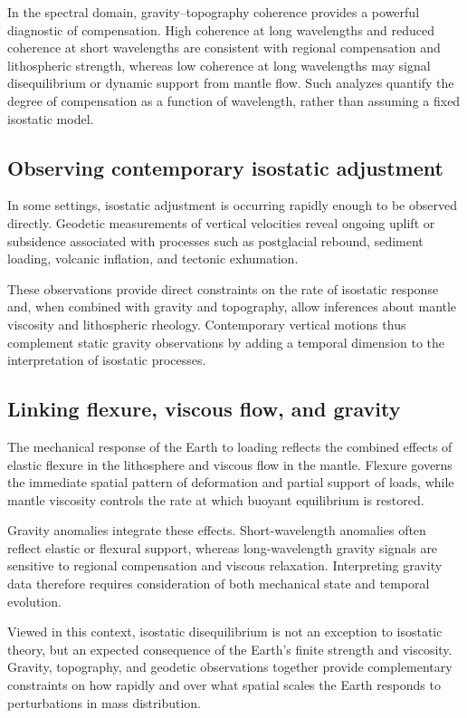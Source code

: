 In the spectral domain, gravity--topography coherence provides a powerful diagnostic of compensation. High coherence at long wavelengths and reduced coherence at short wavelengths are consistent with regional compensation and lithospheric strength, whereas low coherence at long wavelengths may signal disequilibrium or dynamic support from mantle flow. Such analyzes quantify the degree of compensation as a function of wavelength, rather than assuming a fixed isostatic model.

\subsection{Observing contemporary isostatic adjustment}

In some settings, isostatic adjustment is occurring rapidly enough to be observed directly. Geodetic measurements of vertical velocities reveal ongoing uplift or subsidence associated with processes such as postglacial rebound, sediment loading, volcanic inflation, and tectonic exhumation.

These observations provide direct constraints on the rate of isostatic response and, when combined with gravity and topography, allow inferences about mantle viscosity and lithospheric rheology. Contemporary vertical motions thus complement static gravity observations by adding a temporal dimension to the interpretation of isostatic processes.

\subsection{Linking flexure, viscous flow, and gravity}

The mechanical response of the Earth to loading reflects the combined effects of elastic flexure in the lithosphere and viscous flow in the mantle. Flexure governs the immediate spatial pattern of deformation and partial support of loads, while mantle viscosity controls the rate at which buoyant equilibrium is restored.

Gravity anomalies integrate these effects. Short-wavelength anomalies often reflect elastic or flexural support, whereas long-wavelength gravity signals are sensitive to regional compensation and viscous relaxation. Interpreting gravity data therefore requires consideration of both mechanical state and temporal evolution.

Viewed in this context, isostatic disequilibrium is not an exception to isostatic theory, but an expected consequence of the Earth's finite strength and viscosity. Gravity, topography, and geodetic observations together provide complementary constraints on how rapidly and over what spatial scales the Earth responds to perturbations in mass distribution.

